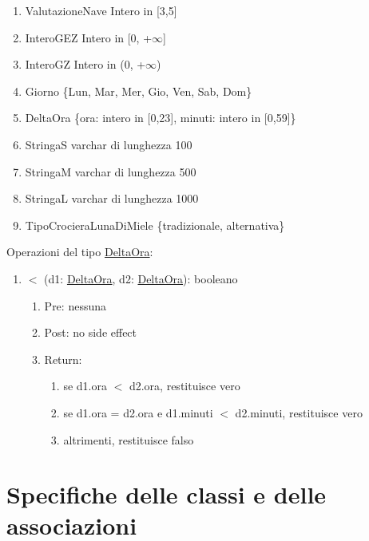 \documentclass{article}
\begin{document}
\begin{enumerate}
    \item ValutazioneNave Intero in [3,5]\label{sec:ValutazioneNave}
    \item InteroGEZ Intero in [0, +$\infty$]\label{sec:InteroGEZ}
    \item InteroGZ Intero in (0, +$\infty$)\label{sec:InteroGZ}
    \item Giorno \{Lun, Mar, Mer, Gio, Ven, Sab, Dom\}\label{sec:Giorno}
    \item DeltaOra \{ora: intero in [0,23], minuti: intero in [0,59]\}\label{sec:DeltaOra}
    \item StringaS varchar di lunghezza 100\label{sec:StringaS}
    \item StringaM varchar di lunghezza 500\label{sec:StringaM}
    \item StringaL varchar di lunghezza 1000\label{sec:StringaL}
    \item TipoCrocieraLunaDiMiele \{tradizionale, alternativa\}\label{sec:TipoCrocieraLunaDiMiele}
\end{enumerate}

Operazioni del tipo \hyperref[sec:DeltaOra]{DeltaOra}:\label{sec:OperazioniDeltaOra}

\begin{enumerate}
    \item $<$ (d1: \hyperref[sec:DeltaOra]{DeltaOra}, d2: \hyperref[sec:DeltaOra]{DeltaOra}): booleano
    \begin{enumerate}
        \item Pre: nessuna
        \item Post: no side effect
        \item Return:
        \begin{enumerate}
            \item se d1.ora $<$ d2.ora, restituisce vero
            \item se d1.ora = d2.ora e d1.minuti $<$ d2.minuti, restituisce vero
            \item altrimenti, restituisce falso
        \end{enumerate}
    \end{enumerate}
\end{enumerate}

\newpage
\section{Specifiche delle classi e delle associazioni}
\end{document}

